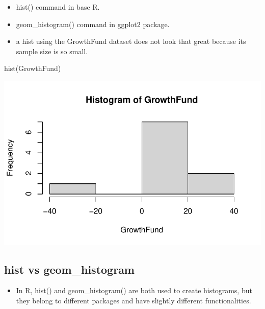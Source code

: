 \documentclass[
  letterpaper,
  DIV=11,
  numbers=noendperiod]{scrreprt}
\newenvironment{Shaded}{\begin{snugshade}}{\end{snugshade}}
\newcommand{\FunctionTok}[1]{\textcolor[rgb]{0.28,0.35,0.67}{#1}}
\newcommand{\NormalTok}[1]{\textcolor[rgb]{0.00,0.23,0.31}{#1}}
\providecommand{\tightlist}{%
  \setlength{\itemsep}{0pt}\setlength{\parskip}{0pt}}\usepackage{longtable,booktabs,array}
\begin{document}
\begin{itemize}
\item
  hist() command in base R.
\item
  geom\_histogram() command in ggplot2 package.
\item
  a hist using the GrowthFund dataset does not look that great because
  its sample size is so small.
\end{itemize}

\begin{Shaded}
\begin{Highlighting}[]
\FunctionTok{hist}\NormalTok{(GrowthFund)}
\end{Highlighting}
\end{Shaded}

\includegraphics{descriptives_files/figure-pdf/unnamed-chunk-21-1.pdf}

\subsection{hist vs geom\_histogram}\label{hist-vs-geom_histogram}

\begin{itemize}
\tightlist
\item
  In R, hist() and geom\_histogram() are both used to create histograms,
  but they belong to different packages and have slightly different
  functionalities.
\end{itemize}
\end{document}
